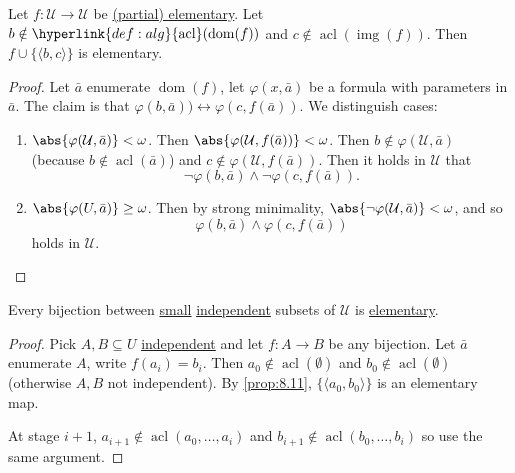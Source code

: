 \documentclass{article}
\DeclareMathOperator{\dom}{dom}
\DeclareMathOperator{\img}{img}
\DeclareMathOperator{\acl}{acl}
\begin{document}
\begin{nprop}\label{prop:8.11}
  Let $f: \mathcal{U} \to \mathcal{U}$ be \hyperlink{def:upe}{(partial) elementary}.
  Let $b \notin \hyperlink{def:alg}{\acl}(\dom(f))$ and $c \notin \acl(\img(f))$.
  Then $f \cup \{\langle b, c \rangle\}$ is elementary.
\end{nprop}
\begin{proof}
  Let $\bar{a}$ enumerate $\dom(f)$, let $\varphi(x, \bar{a})$ be a formula with parameters in $\bar{a}$.
  The claim is that $\varphi(b,\bar{a})) \leftrightarrow \varphi(c, f(\bar{a}))$. We distinguish cases:
  \begin{enumerate}
  \item $\abs{\varphi(\mathcal{U}, \bar{a})} < \omega$. Then $\abs{\varphi(\mathcal{U}, f(\bar{a}))} < \omega$.
    Then $b \notin \varphi(\mathcal{U}, \bar{a})$ (because $b \notin \acl(\bar{a})$) and $c \notin \varphi(\mathcal{U}, f(\bar{a}))$.
    Then it holds in $\mathcal{U}$ that
    \begin{equation*}
      \lnot \varphi(b, \bar{a}) \land \neg \varphi(c, f(\bar{a})).
    \end{equation*}
  \item $\abs{\varphi(U, \bar{a})} \geq \omega$. Then by strong minimality, $\abs{\neg \varphi(\mathcal{U}, \bar{a})} < \omega$, and so
    \begin{equation*}
      \varphi(b, \bar{a}) \land \varphi(c, f(\bar{a}))
    \end{equation*}
    holds in $\mathcal{U}$. \qedhere
  \end{enumerate}
\end{proof}
\begin{ncor}\label{cor:8.12}
  Every bijection between \hyperlink{def:small}{small} \hyperlink{def:indep}{independent} subsets of $\mathcal{U}$ is \hyperlink{def:upe}{elementary}.  \end{ncor}
\begin{proof}
  Pick $A,B \subseteq U$ \hyperlink{def:indep}{independent} and let $f: A \to B$ be any bijection.
  Let $\bar{a}$ enumerate $A$, write $f(a_i) = b_i$.
  Then $a_0 \notin \acl(\emptyset)$ and $b_0 \notin \acl(\emptyset)$ (otherwise $A,B$ not independent). By \cref{prop:8.11}, $\{\langle a_0, b_0 \rangle \}$ is an elementary map.

  At stage $i+1$, $a_{i+1} \notin \acl(a_0, \dotsc, a_i)$ and $b_{i+1} \notin \acl(b_0, \dotsc, b_i)$ so use the same argument.
\end{proof}
\end{document}
